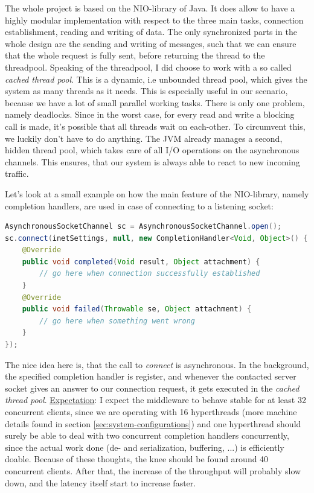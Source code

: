 \documentclass[11pt]{article}
\begin{document}
The whole project is based on the NIO-library of Java. It does allow to have a highly modular implementation with respect to the three main tasks, connection establishment, reading and writing of data. The only synchronized parts in the whole design are the sending and writing of messages, such that we can ensure that the whole request is fully sent, before returning the thread to the threadpool. Speaking of the threadpool, I did choose to work with a so called \textit{cached thread pool}. This is a dynamic, i.e unbounded thread pool, which gives the system as many threads as it needs. This is especially useful in our scenario, because we have a lot of small parallel working tasks. There is only one problem, namely deadlocks. Since in the worst case, for every read and write a blocking call is made, it's possible that all threads wait on each-other. To circumvent this, we luckily don't have to do anything. The JVM already manages a second, hidden thread pool, which takes care of all I/O operations on the asynchronous channels. This ensures, that our system is always able to react to new incoming traffic.

Let's look at a small example on how the main feature of the NIO-library, namely completion handlers, are used in case of connecting to a listening socket:
\begin{lstlisting}[basicstyle=\small, language=Java]
AsynchronousSocketChannel sc = AsynchronousSocketChannel.open();
sc.connect(inetSettings, null, new CompletionHandler<Void, Object>() {
	@Override
	public void completed(Void result, Object attachment) {
		// go here when connection successfully established
	}
	@Override
	public void failed(Throwable se, Object attachment) {
		// go here when something went wrong
	}
});
\end{lstlisting}
The nice idea here is, that the call to \textit{connect} is asynchronous. In the background, the specified completion handler is register, and whenever the contacted server socket gives an answer to our connection request, it gets executed in the \textit{cached thread pool}.
\newline\underline{Expectation}: I expect the middleware to behave stable for at least 32 concurrent clients, since we are operating with 16 hyperthreads (more machine details found in section \ref{sec:system-configurations}) and one hyperthread should surely be able to deal with two concurrent completion handlers concurrently, since the actual work done (de- and serialization, buffering, ...) is efficiently doable. Because of these thoughts, the knee should be found around 40 concurrent clients. After that, the increase of the throughput will probably slow down, and the latency itself start to increase faster.
\end{document}
